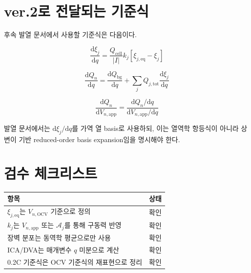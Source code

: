 \documentclass[11pt,a4paper]{article}
\newcommand{\dd}{\mathrm{d}}
\newcommand{\OCV}{\mathrm{OCV}}
\newcommand{\app}{\mathrm{app}}
\newcommand{\eq}{\mathrm{eq}}
\newcommand{\tot}{\mathrm{tot}}
\newcommand{\bg}{\mathrm{bg}}
\newcommand{\cell}{\mathrm{cell}}
\begin{document}
\section{ver.2로 전달되는 기준식}
후속 발열 문서에서 사용할 기준식은 다음이다.

\begin{equation}
\frac{\dd\xi_j}{\dd q}=\frac{Q_{\cell}}{|I|}k_j\left[\xi_{j,\eq}-\xi_j\right]
\end{equation}

\begin{equation}
\frac{\dd Q_n}{\dd q}=\frac{\dd Q_{\bg}}{\dd q}+\sum_jQ_{j,\tot}\frac{\dd\xi_j}{\dd q}
\end{equation}

\begin{equation}
\frac{\dd Q_n}{\dd V_{n,\app}}=\frac{\dd Q_n/\dd q}{\dd V_{n,\app}/\dd q}
\end{equation}

발열 문서에서는 \(\dd\xi_j/\dd q\)를 가역 열 basis로 사용하되, 이는 열역학 항등식이 아니라 상변이 기반 reduced-order basis expansion임을 명시해야 한다.

\section{검수 체크리스트}
\begin{longtable}{p{}p{}}
\toprule
항목 & 상태 \\
\midrule
\endhead
\(\xi_{j,\eq}\)는 \(V_{n,\OCV}\) 기준으로 정의 & 확인 \\
\(k_j\)는 \(V_{n,\app}\) 또는 \(\mathcal A_j\)를 통해 구동력 반영 & 확인 \\
장벽 분포는 동역학 평균으로만 사용 & 확인 \\
ICA/DVA는 매개변수 \(q\) 미분으로 계산 & 확인 \\
0.2C 기준식은 OCV 기준식의 재표현으로 정리 & 확인 \\
\bottomrule
\end{longtable}
\end{document}
